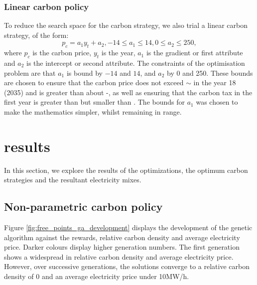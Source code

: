 \subsubsection{Linear carbon policy}
\label{sssec:linear_carbon_strategy}
To reduce the search space for the carbon strategy, we also trial a linear carbon strategy, of the form:
\begin{equation}
p_c=a_1y_t+a_2, -14 \leq a_1\leq 14, 0 \leq a_2\leq 250,
\end{equation}
\noindent where $p_c$ is the carbon price, $y_t$ is the year, $a_1$ is the gradient or first attribute and $a_2$ is the intercept or second attribute. The constraints of the optimisation problem are that $a_1$ is bound by $-14$ and $14$, and $a_2$ by 0 and 250. These bounds are chosen to ensure that the carbon price does not exceed ${\sim}$ in the year 18 (2035) and is greater than about -, as well as ensuring that the carbon tax in the first year is greater than  but smaller than . The bounds for $a_1$ was chosen to make the mathematics simpler, whilst remaining in range.

\section{results}
\label{sec:results}

In this section, we explore the results of the optimizations, the optimum carbon strategies and the resultant electricity mixes.

\subsection{Non-parametric carbon policy}
\label{sssec:result_non_parametric_strategy}

Figure \ref{fig:free_points_ga_development} displays the development of the genetic algorithm against the rewards, relative carbon density and average electricity price. Darker colours display higher generation numbers. The first generation shows a widespread in relative carbon density and average electricity price. However, over successive generations, the solutions converge to a relative carbon density of 0 and an average electricity price under \textsterling10MW/h. 

